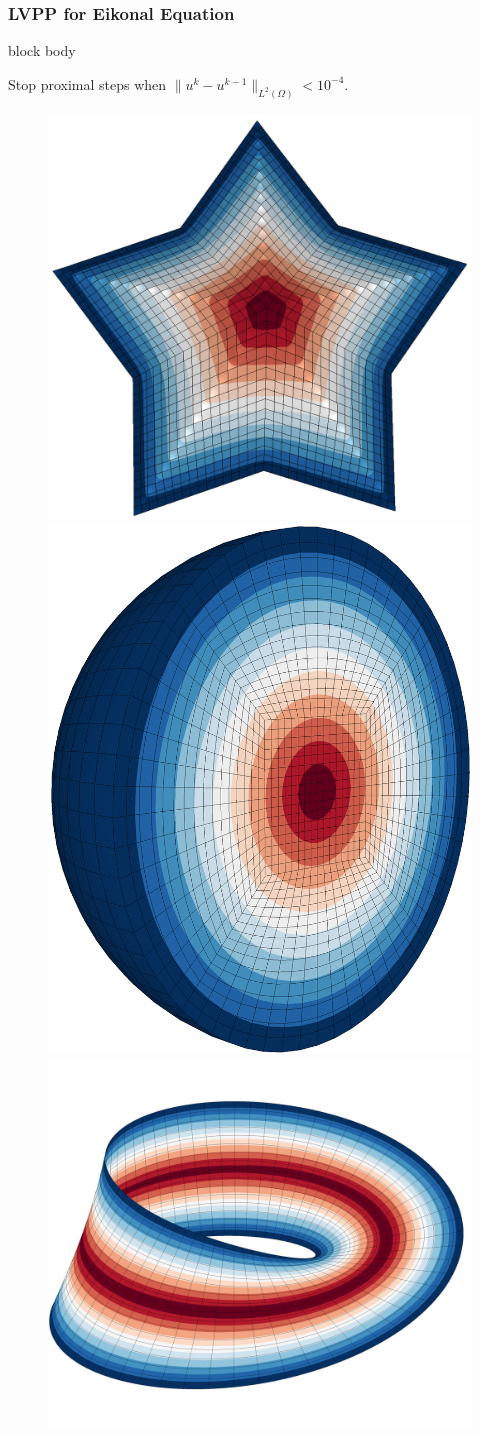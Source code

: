 \documentclass[aspectratio=169,xcolor=dvipsnames,11pt]{beamer}
\begin{document}
\begin{frame}\frametitle{LVPP for Eikonal Equation}
\begin{minipage}{0.35\linewidth}
\begin{beamercolorbox}[rounded=true, shadow=true, wd=\textwidth]{block body}
  \medskip
 

Stop proximal steps when $\|u^k - u^{k-1}\|_{L^2(\Omega)} < 10^{-4}$.
\end{beamercolorbox}
\end{minipage}\hspace{0ex}
\begin{minipage}{0.6\linewidth}
 \centering
\begin{figure}
\centering
    \subcaptionbox*{} {\includegraphics[width=0.29\linewidth]{figures/Eikonal.png}}
    \subcaptionbox*{} {\includegraphics[width=0.23\linewidth]{figures/eikonal_sphere.png}}
    \subcaptionbox*{} {\includegraphics[width=0.29\linewidth]{figures/eikonal_mobius.png}}

\end{figure}
\end{minipage}
\end{frame}
\end{document}
